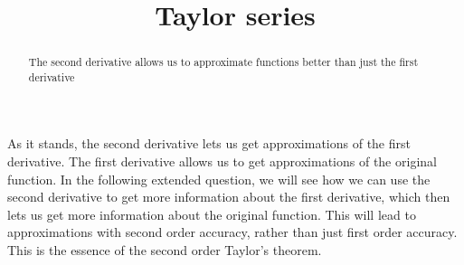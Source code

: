 \documentclass{ximera}
\title{Taylor series}
\begin{document}
\begin{abstract}
  The second derivative allows us to approximate functions better than just the first derivative
\end{abstract}\maketitle

As it stands, the second derivative lets us get approximations of the first derivative.  The first derivative allows us to get approximations of the original function.
In the following extended question, we will see how we can use the second derivative to get more information about the first derivative, which then lets us get more
information about the original function.  This will lead to approximations with second order accuracy, rather than just first order accuracy.  This is the essence of 
the second order Taylor's theorem.
\end{document}
